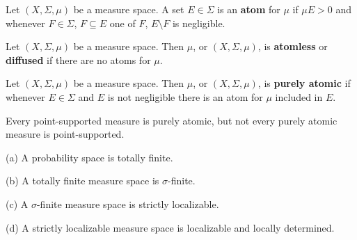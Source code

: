      
     
 Let $(X,\Sigma,\mu)$ be a measure space.    A
set $E\in\Sigma$ is an {\bf atom} for $\mu$ if $\mu E>0$ and
whenever $F\in\Sigma$, $F\subseteq E$ one of $F$, $E\setminus F$ is
negligible.
     
 Let $(X,\Sigma,\mu)$ be a measure space.
Then $\mu$, or $(X,\Sigma,\mu)$, is {\bf atomless} or {\bf diffused} if 
there are no atoms for $\mu$.
     
 Let $(X,\Sigma,\mu)$ be a measure space.
Then $\mu$, or $(X,\Sigma,\mu)$, is {\bf purely atomic} if whenever
$E\in\Sigma$ and $E$ is not negligible there is an atom for $\mu$
included in $E$.
     
\medskip
     
    
Every point-supported measure is purely atomic, but not every purely atomic measure is
point-supported.
     
     
 (a) A probability space is
totally finite.
     
(b) A totally finite measure space is $\sigma$-finite.
     
(c) A $\sigma$-finite measure space is strictly localizable.
     
(d) A strictly localizable measure space is localizable and locally
determined.
     
